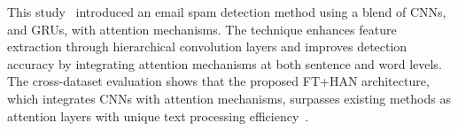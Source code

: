 This study~\cite{sultanzavrak_2023_email} introduced an email spam detection method using a blend of CNNs, and GRUs, with attention mechanisms. The technique enhances feature extraction through hierarchical convolution layers and improves detection accuracy by integrating attention mechanisms at both sentence and word levels. The cross-dataset evaluation shows that the proposed FT+HAN architecture, which integrates CNNs with attention mechanisms, surpasses existing methods as attention layers with unique text processing efficiency~\cite{vaswani_2017_attention}.